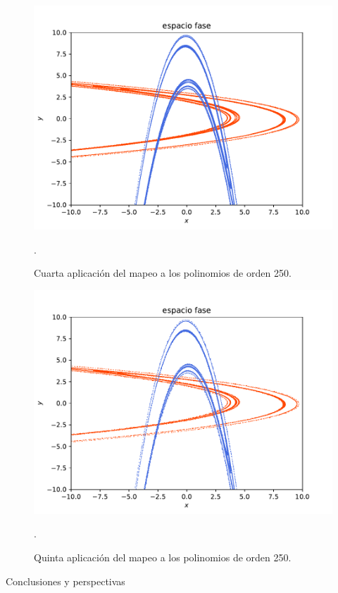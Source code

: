 \documentclass[11pt]{beamer}
\theoremstyle{definition}
\begin{document}
\begin{frame}
\begin{figure}[h!]
	\centering
	\includegraphics[scale=0.6]{rectangulo4.pdf}
	\caption{Cuarta aplicación del mapeo a los polinomios de orden 250.}.
	\label{Rectangulo4}
\end{figure}
\end{frame}
\begin{frame}
\begin{figure}[H]
	\centering
	\includegraphics[scale=0.6]{rectangulo5.pdf}
	\caption{Quinta aplicación del mapeo a los polinomios de orden 250.}.
	\label{Rectangulo5}
\end{figure}
\end{frame}
\begin{frame}{Conclusiones y perspectivas}


\end{frame}
\end{document}
